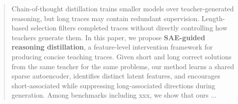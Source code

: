 \begin{abstract}
Chain-of-thought distillation trains smaller models over teacher-generated reasoning, but long traces may contain redundant supervision.
Length-based selection filters completed traces without directly controlling how teachers generate them.
In this paper, we propose \textbf{SAE-guided reasoning distillation}, a feature-level intervention framework for producing concise teaching traces.
Given short and long correct solutions from the same teacher for the same problems, our method learns a shared sparse autoencoder, identifies distinct latent features, and encourages short-associated while suppressing long-associated directions during generation.
Among benchmarks including xxx, we show that ours ...
\end{abstract}
